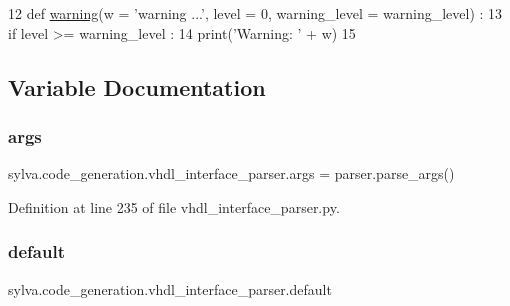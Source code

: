 \begin{DoxyCode}
12 \textcolor{keyword}{def }\hyperlink{namespacesylva_1_1code__generation_1_1vhdl__interface__parser_a63f8ceba954ddb8e1d7713fead5ffc9c}{warning}(w = 'warning ...', level = 0, warning\_level = warning\_level) :
13   \textcolor{keywordflow}{if} level >= warning\_level :
14     print(\textcolor{stringliteral}{'Warning: '} + w)
15 
\end{DoxyCode}


\subsection{Variable Documentation}
\mbox{\label{namespacesylva_1_1code__generation_1_1vhdl__interface__parser_a3fd0b243c6ced038508dd7910723a009}} 
\subsubsection{\texorpdfstring{args}{args}}
{\footnotesize\ttfamily sylva.\+code\+\_\+generation.\+vhdl\+\_\+interface\+\_\+parser.\+args = parser.\+parse\+\_\+args()}



Definition at line 235 of file vhdl\+\_\+interface\+\_\+parser.\+py.

\mbox{\label{namespacesylva_1_1code__generation_1_1vhdl__interface__parser_ac13539f10c901b6537c107ee60cc64b8}} 
\subsubsection{\texorpdfstring{default}{default}}
{\footnotesize\ttfamily sylva.\+code\+\_\+generation.\+vhdl\+\_\+interface\+\_\+parser.\+default}



